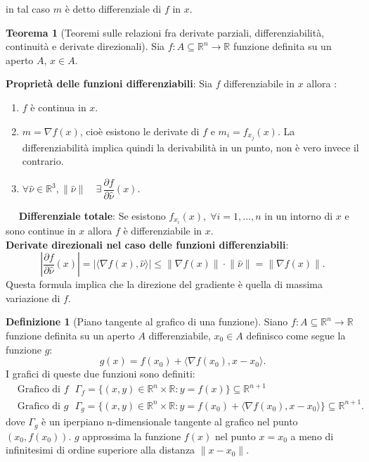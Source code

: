 \documentclass[leqno]{article}
\theoremstyle{definition}
\newtheorem{definition}{Definizione}[section]
\numberwithin{equation}{section}
\newtheorem{theorem}{Teorema}[section]
\theoremstyle{remark}
\begin{document}
	in tal caso $m$ è detto differenziale di $f$ in $x$.
	
	\begin{theorem}[Teoremi sulle relazioni fra derivate parziali, differenziabilità, continuità e derivate direzionali]
		Sia $f:A\subseteq \mathbb{R}^n \rightarrow \mathbb{R}$ funzione definita su un aperto $A$, $ {x} \in A$.
		\newline
		
		\textbf{Proprietà delle funzioni differenziabili}:
		Sia $f$ differenziabile in $x$ allora :
		\begin{enumerate}
			\item $f$ è continua in $x$.
			\item $m=\nabla f (x)$, cioè esistono le derivate di $f$ e $m_i=f_{x_j}(x).$ La differenziabilità implica quindi la derivabilità in un punto, non è vero invece il contrario.
			\item $\forall \hat{\nu} \in \mathbb{R}^3, \lVert \hat{\nu} \rVert \quad \exists \, \dfrac{\partial f }{\partial \hat{\nu}}(x)$.
		\end{enumerate} 
		$\quad$ \textbf{Differenziale totale}: Se esistono $f_{x_i}(x), \; \forall i = 1, \dots ,n$ in un intorno di $x$ e sono continue in $x$ allora $f$ è differenziabile in $x$.
		\\
		\textbf{Derivate direzionali nel caso delle funzioni differenziabili}: 
		\begin{equation}
			\left| \dfrac{\partial f}{\partial \hat{\nu}}(x) \right|=\left| \langle \nabla f(x), \hat{\nu}\rangle \right| \le \lVert \nabla f(x)\rVert \cdot \lVert \hat{\nu} \rVert = \lVert \nabla f(x) \rVert.
		\end{equation}
		Questa formula implica che la direzione del gradiente è quella di massima variazione di $f$.
	\end{theorem}
	
	\begin{definition}[Piano tangente al grafico di una funzione]
		Siano $f:A\subseteq \mathbb{R}^n \rightarrow \mathbb{R}$ funzione definita su un aperto $A$ differenziabile, $ {x_0} \in A$ definisco come segue la funzione $g$:
		\begin{equation}
			g(x) = f(x_0)+\langle \nabla f (x_0) , x-x_0\rangle .
		\end{equation}
		I grafici di queste due funzioni sono definiti:
		\begin{equation}
			\begin{aligned}
				&\text{Grafico di $f$ } \Gamma_f =\{ (x,y)\in \mathbb{R}^n \times \mathbb{R} : y = f(x) \} \subseteq \mathbb{R}^{n+1} \\
				&\text {Grafico di $g$ } \Gamma_g = \{ (x,y)\in \mathbb{R}^n \times \mathbb{R} : y = f(x_0) + \langle \nabla f(x_0) , x - x_0 \rangle \} \subseteq \mathbb{R}^{n+1}.
			\end{aligned}
		\end{equation}
		dove $\Gamma_g$ è un iperpiano n-dimensionale tangente al grafico nel punto $(x_0,f(x_0))$. $g$ approssima la funzione $f(x)$ nel punto $x=x_0$ a meno di infinitesimi di ordine superiore alla distanza $\lVert x-x_0 \rVert$.
	\end{definition}
	
\end{document}
